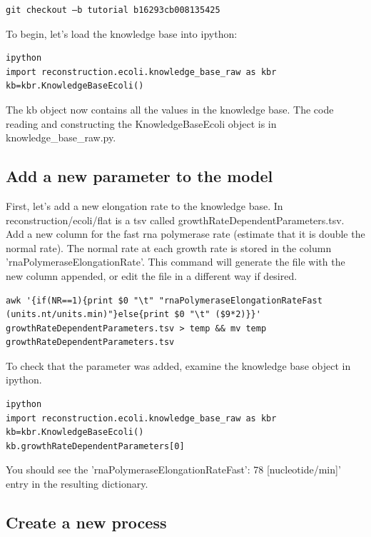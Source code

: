 \documentclass[12pt]{article}
\begin{document}
\lstset{language=bash}
\begin{lstlisting}
git checkout –b tutorial b16293cb008135425
\end{lstlisting}


To begin, let's load the knowledge base into ipython:
\par

\begin{lstlisting}
ipython
import reconstruction.ecoli.knowledge_base_raw as kbr
kb=kbr.KnowledgeBaseEcoli()
\end{lstlisting}

The kb object now contains all the values in the knowledge base. The code reading and constructing the KnowledgeBaseEcoli object is in knowledge\_base\_raw.py.


\subsection{Add a new parameter to the model}

First, let’s add a new elongation rate to the knowledge base. In reconstruction/ecoli/flat is a tsv called growthRateDependentParameters.tsv. Add a new column for the fast rna polymerase rate (estimate that it is double the normal rate). The normal rate at each growth rate is stored in the column 'rnaPolymeraseElongationRate'. This command will generate the file with the new column appended, or edit the file in a different way if desired.

\begin{lstlisting}
awk '{if(NR==1){print $0 "\t" "rnaPolymeraseElongationRateFast (units.nt/units.min)"}else{print $0 "\t" ($9*2)}}' growthRateDependentParameters.tsv > temp && mv temp growthRateDependentParameters.tsv  
\end{lstlisting}

To check that the parameter was added, examine the knowledge base object in ipython.

\lstset{language=Python}
\begin{lstlisting}
ipython
import reconstruction.ecoli.knowledge_base_raw as kbr
kb=kbr.KnowledgeBaseEcoli()
kb.growthRateDependentParameters[0]
\end{lstlisting}

You should see the 'rnaPolymeraseElongationRateFast': 78 [nucleotide/min]' entry in the resulting dictionary.

\subsection{Create a new process}
\end{document}
